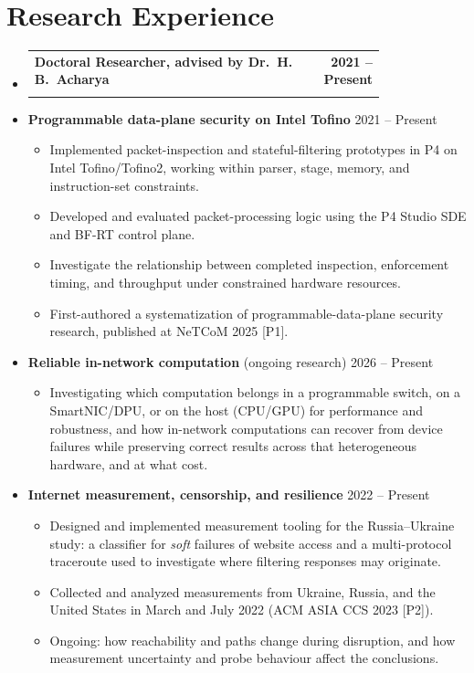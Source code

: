 \documentclass[letterpaper,10pt]{article}
\makeatletter
\newcommand{\cvsection}[2][5]{\Needspace{#1\baselineskip}\section{#2}}
\newcommand{\entry}[4]{%
  \item\begin{tabular*}{\linewidth}{@{}p{0.80\linewidth}@{\extracolsep{\fill}}r@{}}
    \leavevmode\textbf{#1} & \textbf{\small #2}\\
    \leavevmode{\small\itshape\color{muted} #3} & {\small\itshape\color{muted} #4}\\
  \end{tabular*}\vspace{-4pt}}
\newenvironment{entries}{\begin{itemize}[leftmargin=0pt,label={},itemsep=2pt,topsep=0pt,parsep=0pt]}{\end{itemize}}
\newenvironment{bullets}{\begin{itemize}[leftmargin=1.15em,label=\textcolor{accent}{\textbullet},itemsep=1pt,topsep=2pt,parsep=0pt]\small}{\end{itemize}\vspace{-1pt}}
\makeatother
\begin{document}
\cvsection{Research Experience}
\begin{entries}
  \entry{Doctoral Researcher, advised by Dr.\ H.\,B.\ Acharya}{2021 -- Present}
        {Oklahoma State University (2026 -- present) \,\textperiodcentered\, Rochester Institute of Technology (2021 -- 2025)}{}
  \vspace{1pt}
  \item \textbf{Programmable data-plane security on Intel Tofino} \hfill {\small 2021 -- Present}
  \begin{bullets}
    \item Implemented packet-inspection and stateful-filtering prototypes in P4 on Intel Tofino/Tofino2, working within parser,
          stage, memory, and instruction-set constraints.
    \item Developed and evaluated packet-processing logic using the P4 Studio SDE and BF-RT control plane.
    \item Investigate the relationship between completed inspection, enforcement timing, and throughput under constrained
          hardware resources.
    \item First-authored a systematization of programmable-data-plane security research, published at NeTCoM 2025 [P1].
  \end{bullets}
  \item \textbf{Reliable in-network computation} (ongoing research) \hfill {\small 2026 -- Present}
  \begin{bullets}
    \item Investigating which computation belongs in a programmable switch, on a SmartNIC/DPU, or on the host (CPU/GPU) for
          performance and robustness, and how in-network computations can recover from device failures while preserving correct
          results across that heterogeneous hardware, and at what cost.
  \end{bullets}
  \item \textbf{Internet measurement, censorship, and resilience} \hfill {\small 2022 -- Present}
  \begin{bullets}
    \item Designed and implemented measurement tooling for the Russia--Ukraine study: a classifier for \emph{soft} failures of
          website access and a multi-protocol traceroute used to investigate where filtering responses may originate.
    \item Collected and analyzed measurements from Ukraine, Russia, and the United States in March and July 2022 (ACM ASIA CCS 2023 [P2]).
    \item Ongoing: how reachability and paths change during disruption, and how measurement uncertainty and probe behaviour
          affect the conclusions.
  \end{bullets}
\end{entries}
\end{document}
